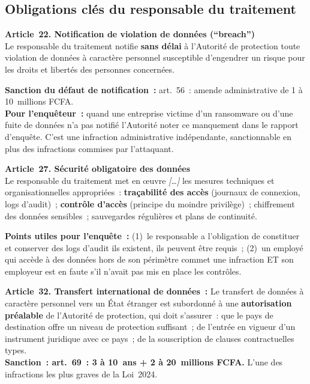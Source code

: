 \subsection{Obligations clés du responsable du traitement}

\begin{boxjuris}
\textbf{Article~22. Notification de violation de données (``breach'')}\\
Le responsable du traitement notifie \textbf{sans délai} à l'Autorité de
protection toute violation de données à caractère personnel susceptible
d'engendrer un risque pour les droits et libertés des personnes concernées.

\textbf{Sanction du défaut de notification~:} art.~56~: amende
administrative de 1 à 10~millions FCFA.\\[0.3ex]
\textbf{Pour l'enquêteur~:} quand une entreprise victime d'un ransomware
ou d'une fuite de données n'a pas notifié l'Autorité noter ce manquement
dans le rapport d'enquête. C'est une infraction administrative indépendante,
sanctionnable en plus des infractions commises par l'attaquant.
\end{boxjuris}

\begin{boxjuris}
\textbf{Article~27. Sécurité obligatoire des données}\\
Le responsable du traitement met en \oe uvre \textit{[\ldots]} les mesures
techniques et organisationnelles appropriées~: \textbf{traçabilité des accès}
(journaux de connexion, logs d'audit)~; \textbf{contrôle d'accès}
(principe du moindre privilège)~; chiffrement des données sensibles~;
sauvegardes régulières et plans de continuité.

\textbf{Points utiles pour l'enquête~:} (1)~le responsable a l'obligation
de constituer et conserver des logs d'audit ils existent, ils peuvent
être requis~; (2)~un employé qui accède à des données hors de son périmètre
commet une infraction ET son employeur est en faute s'il n'avait pas mis
en place les contrôles.
\end{boxjuris}

\begin{boxjuris}
\textbf{Article~32. Transfert international de données~:}
Le transfert de données à caractère personnel vers un État étranger
est subordonné à une \textbf{autorisation préalable} de l'Autorité
de protection, qui doit s'assurer~: que le pays de destination offre
un niveau de protection suffisant~; de l'entrée en vigueur d'un instrument
juridique avec ce pays~; de la souscription de clauses contractuelles types.\\[0.3ex]
\textbf{Sanction~: art.~69~: 3 à 10~ans + 2 à 20~millions FCFA.}
L'une des infractions les plus graves de la Loi~2024.
\end{boxjuris}

